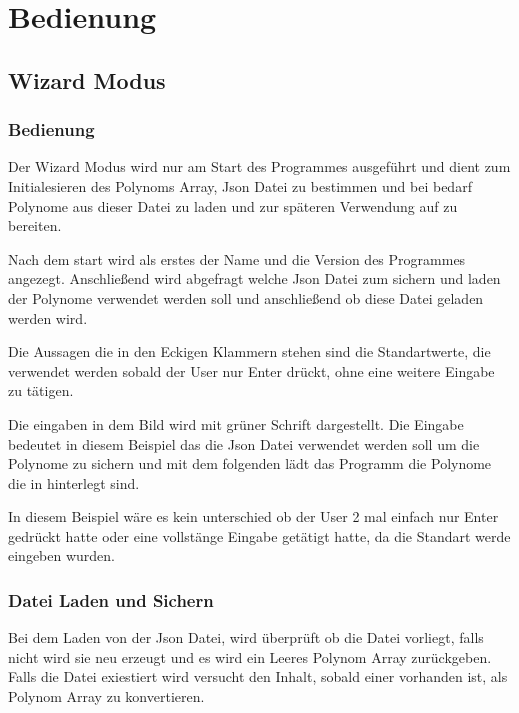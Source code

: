 \documentclass[letterpaper,10pt,ngerman]{sphinxmanual}
\begin{document}
\chapter{Bedienung}
\label{index:bedienung}

\section{Wizard Modus}
\label{wizard:wizard-modus}\label{wizard::doc}

\subsection{Bedienung}
\label{wizard:bedienung}
Der Wizard Modus wird nur am Start des Programmes ausgeführt und dient zum Initialesieren
des Polynoms Array, Json Datei zu bestimmen und bei bedarf Polynome aus dieser Datei zu laden
und zur späteren Verwendung auf zu bereiten.

Nach dem start wird als erstes der Name und die Version des Programmes angezegt.
Anschließend wird abgefragt welche Json Datei zum sichern und laden der Polynome verwendet
werden soll und anschließend ob diese Datei geladen werden wird.

Die Aussagen die in den Eckigen Klammern stehen sind die Standartwerte, die verwendet werden sobald der
User nur Enter drückt, ohne eine weitere Eingabe zu tätigen.

\noindent{}

Die eingaben in dem Bild wird mit grüner Schrift dargestellt. Die Eingabe bedeutet in diesem Beispiel das
die Json Datei  verwendet werden soll um die Polynome zu sichern und mit dem folgenden  lädt das
Programm die Polynome die in  hinterlegt sind.

In diesem Beispiel wäre es kein unterschied ob der User 2 mal einfach nur Enter gedrückt hatte oder eine
vollstänge Eingabe getätigt hatte, da die Standart werde eingeben wurden.


\subsection{Datei Laden und Sichern}
\label{wizard:datei-laden-und-sichern}
Bei dem Laden von der Json Datei, wird überprüft ob die Datei vorliegt, falls nicht wird sie neu erzeugt und
es wird ein Leeres Polynom Array zurückgeben. Falls die Datei exiestiert wird versucht den Inhalt, sobald
einer vorhanden ist, als Polynom Array zu konvertieren.
\end{document}
